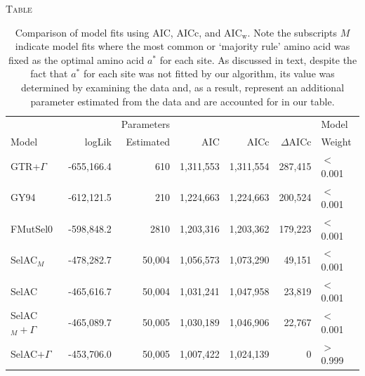 \documentclass[12pt,letterpaper]{article}
\renewcommand{\section}[1]{%
\bigskip
\begin{center}
\begin{Large}
\normalfont\scshape #1
\medskip
\end{Large}
\end{center}}
\newcommand{\DeltaAICc}{\ensuremath{\Delta\text{AICc}}\xspace}
\newcommand{\AICw}{\ensuremath{\text{AIC}_\text{w}}\xspace}
\newcommand{\selac}{SelAC\xspace}
\newcommand{\selacplusgamma}{SelAC$+\Gamma$\xspace}
\newcommand{\selacmaj}{SelAC$_{M}$\xspace}
\newcommand{\selacmajplusgamma}{SelAC$_{M}+\Gamma$\xspace}
\newcommand{\aopt}{\ensuremath{a^*}\xspace}
\begin{document}


\renewcommand\refname{\begin{center}{\normalfont\scshape References}\end{center}}



\clearpage

\section{Table}

  \begin{table}[H]
    \begin{tabular}{lrrrrrl}
                                                &                  &Parameters &              &              &            &    Model\\
      Model                     & logLik   & Estimated &           AIC&          AICc&  \DeltaAICc&  Weight\\\hline
      GTR+$\Gamma$                      & -655,166.4&        610&         1,311,553&      1,311,554&     287,415& $<$0.001\\
      GY94                      & -612,121.5&        210&         1,224,663&         1,224,663&     200,524& $<$0.001\\
      FMutSel0                  & -598,848.2&       2810&         1,203,316&         1,203,362&     179,223& $<$0.001\\
      \selacmaj                     & -478,282.7&       50,004&   1,056,573&     1,073,290&      49,151&     $<$0.001\\
      \selac                    & -465,616.7&       50,004&   1,031,241&     1,047,958&      23,819&      $<$0.001\\
      \selacmajplusgamma            & -465,089.7&       50,005&   1,030,189&     1,046,906&      22,767& $<$0.001\\
      \selacplusgamma           & -453,706.0&       50,005&   1,007,422&     1,024,139&           0& $>$0.999\\
    \end{tabular}
    \caption{Comparison of model fits using AIC, AICc, and \AICw.
Note the subscripts $M$ indicate model fits where the most common or `majority rule' amino acid was fixed as the optimal amino acid \aopt for each site.
As discussed in text, despite the fact that \aopt for each site was not fitted by our algorithm, its value was determined by examining the data and, as a result, represent an additional parameter estimated from the data and are accounted for in our table.
}
    \label{table:modelFits}
\end{table}
\end{document}
